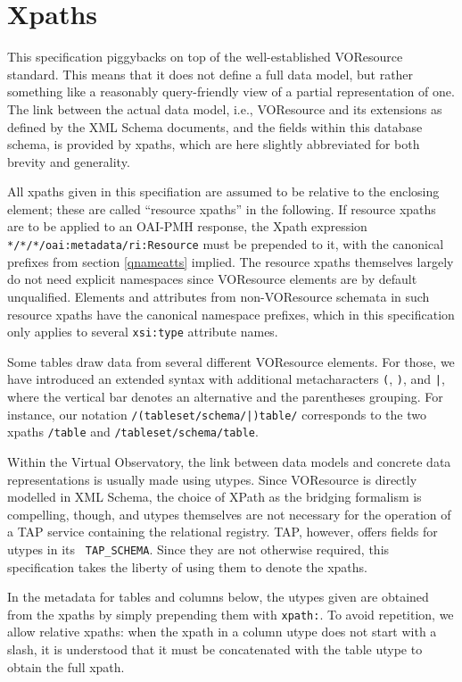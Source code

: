\documentclass[11pt,a4paper]{ivoa}
\newcommand{\tapent}[1]{\texttt{\color{tapcolor} #1}}
\begin{document}
\section{Xpaths}

\label{vorutypes}

This specification piggybacks on top of the well-established
VOResource standard.  This means that it does not define a full data model,
but rather something like a reasonably query-friendly view of a partial
representation of one.  The link between the actual data model, i.e.,
VOResource and its extensions as defined by the XML Schema documents, and
the fields within this database schema, is provided by
xpaths, which are here slightly abbreviated for both brevity and
generality.

All xpaths given in this specifiation are assumed to be relative to
the enclosing  element; these are called
``resource xpaths'' in the following.  If resource xpaths are to be
applied to an OAI-PMH response, the Xpath expression
\texttt{*/*/*/oai:metadata/ri:Resource} must be prepended to it,
with the canonical prefixes from section \ref{qnameatts} implied.  The resource xpaths themselves
largely do not need explicit namespaces since VOResource elements are by
default unqualified.  Elements and attributes from non-VOResource
schemata in such resource xpaths have the canonical namespace prefixes, which in this
specification only applies to several \texttt{xsi:type} attribute
names.

Some tables draw data from several different VOResource elements.
For those, we have introduced an extended syntax with additional
metacharacters \verb$($, \verb$)$, and \verb$|$, 
where the vertical bar denotes an
alternative and the parentheses grouping.  For instance, our notation
\texttt{/(tableset/schema/|)table/} corresponds to the two xpaths
\texttt{/table} and \texttt{/tableset/schema/table}.

Within the Virtual Observatory, the link between data models and
concrete data representations is usually made using utypes.
Since VOResource is directly modelled
in XML Schema, the choice of XPath as the bridging formalism is 
compelling, though, and utypes themselves are not necessary for the
operation of a TAP service containing the relational registry.
TAP, however, offers fields for utypes in its \tapent{TAP\_SCHEMA}.  Since they
are not otherwise required, this specification takes the liberty of
using them to denote the xpaths.

In the metadata for tables and columns below, the utypes given are
obtained from the xpaths by simply prepending them with
\texttt{xpath:}.  To avoid repetition, we allow relative xpaths:
when the xpath in a column utype does not start with a slash, it is
understood that it must be concatenated with the table utype to obtain
the full xpath.
\end{document}
